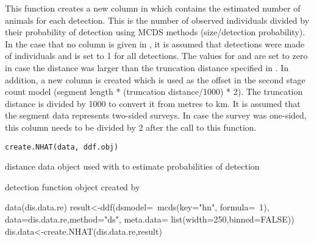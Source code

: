 \documentclass[a4paper]{book}
\begin{document}
%
\begin{Examples}
\end{Examples}
%
\begin{Description}\relax
This function creates a new column in  which contains the estimated 
number of animals for each detection. This is the number of observed individuals 
divided by their probability of detection using MCDS methods (size/detection probability). 
In the case that no  column is given in , it is assumed that 
detections were made of individuals and  is set to 1 for all detections. The values 
for  and  are set to zero in case the distance was larger than the 
truncation distance  specified in .
In addition, a new column  is created which is used as the offset in the 
second stage count model (segment length * (truncation distance/1000) * 2). The truncation
distance is divided by 1000 to convert it from metres to km. It is assumed that the 
segment data represents two-sided surveys. In case the survey was one-sided, this column needs to 
be divided by 2 after the call to this function.
\end{Description}
%
\begin{Usage}
\begin{verbatim}
create.NHAT(data, ddf.obj)
\end{verbatim}
\end{Usage}
%
\begin{Arguments}
\begin{ldescription}
\item[\code{data}] distance data object used with  to estimate probabilities of detection

\item[\code{ddf.obj}] detection function object created by 
\end{ldescription}
\end{Arguments}
%
\begin{Examples}
\begin{ExampleCode}
data(dis.data.re)
result<-ddf(dsmodel=~mcds(key="hn", formula=~1), data=dis.data.re,method="ds", 
     meta.data= list(width=250,binned=FALSE))
dis.data<-create.NHAT(dis.data.re,result)

\end{ExampleCode}
\end{Examples}
\end{document}
